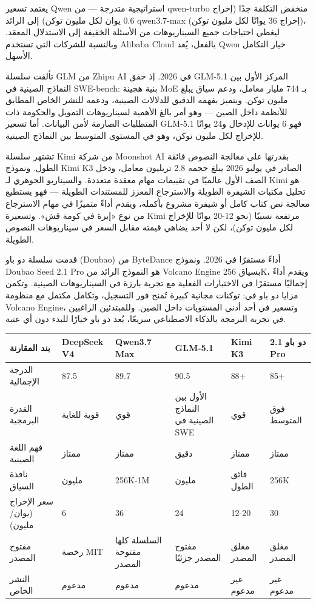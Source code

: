 يعتمد تسعير Qwen استراتيجية متدرجة — من qwen-turbo منخفض التكلفة جدًا (إخراج 0.6 يوان لكل مليون توكن) إلى الرائد qwen3.7-max (إخراج 36 يوانًا لكل مليون توكن)، ليغطي احتياجات جميع السيناريوهات من الأسئلة الخفيفة إلى الاستدلال المعقد. وبالنسبة للشركات التي تستخدم Alibaba Cloud بالفعل، يُعد Qwen خيار التكامل الأسهل.


تألقت سلسلة GLM من Zhipu AI في 2026. إذ حقق GLM-5.1 المركز الأول بين النماذج الصينية في SWE-bench: بنية هجينة MoE بـ 744 مليار معامل، ودعم سياق يبلغ مليون توكن. ويتميز بفهمه الدقيق للدلالات الصينية، ودعمه للنشر الخاص المطابق للأنظمة داخل الصين — وهو أمر بالغ الأهمية لسيناريوهات التمويل والحكومة ذات المتطلبات الصارمة لأمن البيانات. أما تسعير GLM-5.1 فهو 6 يوانات للإدخال و24 يوانًا للإخراج لكل مليون توكن، وهو في المستوى المتوسط بين النماذج الصينية.


تشتهر سلسلة Kimi من شركة Moonshot AI بقدرتها على معالجة النصوص فائقة الطول. ونموذج Kimi K3 الصادر في يوليو 2026 يبلغ حجمه 2.8 تريليون معامل، ودخل الصف الأول عالميًا في تقييمات مهام معقدة متعددة. والسيناريو الجوهري لـ Kimi هو تحليل مكتبات الشيفرة الطويلة والاسترجاع المعزز للمستندات الطويلة — فهو يستطيع معالجة نص كتاب كامل أو شيفرة مشروع بأكمله، ويقدم أداءً متميزًا في مهام الاسترجاع من نوع «إبرة في كومة قش». وتسعيرة Kimi مرتفعة نسبيًا (نحو 12-20 يوانًا للإخراج لكل مليون توكن)، لكن لا أحد يضاهي قيمته مقابل السعر في سيناريوهات النصوص الطويلة.


قدمت سلسلة دو باو (Doubao) من ByteDance أداءً مستقرًا في 2026. ونموذج Doubao Seed 2.1 Pro هو النموذج الرائد من Volcano Engine بسياق 256K، ويقدم أداءً إجماليًا مستقرًا في الاختبارات الفعلية مع تجربة بارزة في السيناريوهات الصينية. وتكمن مزايا دو باو في: توكنات مجانية كبيرة تُمنح فور التسجيل، وتكامل مكتمل مع منظومة Volcano Engine، وتسعير في أحد أدنى المستويات داخل الصين. وللمبتدئين الراغبين في تجربة البرمجة بالذكاء الاصطناعي سريعًا، يُعد دو باو خيارًا للبدء دون أي عتبة.

\begin{center}
\begin{tabularx}{\linewidth}{|X|X|X|X|X|X|}
\hline
\textbf{بند المقارنة} & \textbf{DeepSeek V4} & \textbf{Qwen3.7 Max} & \textbf{GLM-5.1} & \textbf{Kimi K3} & \textbf{دو باو 2.1 Pro} \tabularnewline
\hline
الدرجة الإجمالية & 87.5 & 89.7 & 90.5 & 88+ & 85+ \tabularnewline
القدرة البرمجية & قوية للغاية & قوي & الأول بين النماذج الصينية في SWE & قوي & فوق المتوسط \tabularnewline
فهم اللغة الصينية & ممتاز & ممتاز & دقيق & ممتاز & ممتاز \tabularnewline
نافذة السياق & مليون & 256K-1M & مليون & فائق الطول & 256K \tabularnewline
سعر الإخراج (يوان/مليون) & 6 & 36 & 24 & 12-20 & 30 \tabularnewline
مفتوح المصدر & رخصة MIT & السلسلة كلها مفتوحة المصدر & مفتوح المصدر جزئيًا & مغلق المصدر & مغلق المصدر \tabularnewline
النشر الخاص & مدعوم & مدعوم & مدعوم & غير مدعوم & غير مدعوم \tabularnewline
\hline
\end{tabularx}
\end{center}

